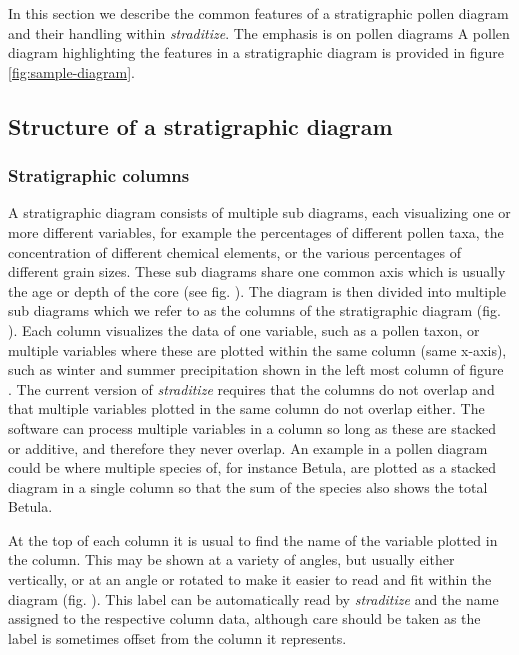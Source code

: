\begin{refsection}
In this section we describe the common features of a stratigraphic pollen diagram and their handling within \emph{straditize}. The emphasis is on pollen diagrams
A pollen diagram highlighting the features in a stratigraphic diagram is provided in figure
\ref{fig:sample-diagram}.

\subsection{Structure of a stratigraphic diagram}  \label{sec:straditize-structure}

\subsubsection{Stratigraphic columns}  \label{sec:straditize-strati-columns}
A stratigraphic diagram consists of multiple sub diagrams, each visualizing one or more different variables, for example the percentages of different pollen taxa, the concentration of different chemical elements, or the various percentages of different grain sizes. These sub diagrams share one common axis which is usually the age or depth of the core (see fig. \samplediagram[a]). 
The diagram is then divided into multiple sub diagrams which we refer to as the columns of the stratigraphic diagram (fig. \samplediagram[b]). Each column visualizes the data of one variable, such as a pollen taxon, or multiple variables where these are plotted within the same column (same x-axis), such as winter and summer precipitation shown in the left most column of figure \samplediagram. The current version of \emph{straditize} requires that the columns do not overlap and that multiple variables plotted in the same column do not overlap either. The software can process multiple variables in a column so long as these are stacked or additive, and therefore they never overlap. An example in a pollen diagram could be where multiple species of, for instance Betula, are plotted as a stacked diagram in a single column so that the sum of the species also shows the total Betula.  

At the top of each column it is usual to find the name of the variable plotted in the column. This may be shown at a variety of angles, but usually either vertically, or at an angle or rotated to make it easier to read and fit within the diagram (fig. \samplediagram[c]). This label can be automatically read by \emph{straditize} and the name assigned to the respective column data, although care should be taken as the label is sometimes offset from the column it represents.  


\end{refsection}
